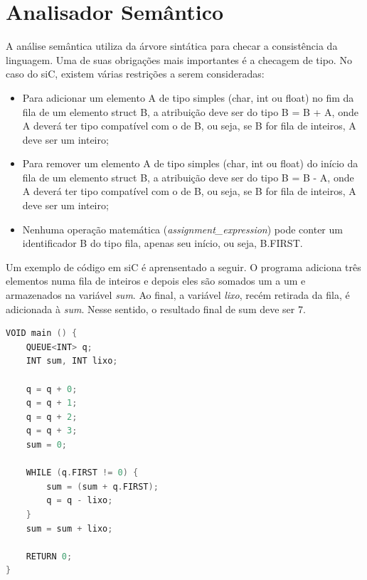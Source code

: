 \documentclass[12pt]{article}
\begin{document}


\section{Analisador Semântico}

\indent A análise semântica utiliza da árvore sintática para checar a consistência da linguagem. Uma de suas obrigações mais importantes é a checagem de tipo. No caso do siC, existem várias restrições a serem consideradas:
\begin{itemize}
    \item Para adicionar um elemento A de tipo simples (char, int ou float) no fim da fila de um elemento struct B, a atribuição deve ser do tipo B = B + A, onde A deverá ter tipo compatível com o de B, ou seja, se B for fila de inteiros, A deve ser um inteiro;
    \item Para remover um elemento A de tipo simples (char, int ou float) do início da fila de um elemento struct B, a atribuição deve ser do tipo B = B - A, onde A deverá ter tipo compatível com o de B, ou seja, se B for fila de inteiros, A deve ser um inteiro;
    \item Nenhuma operação matemática (\textit{assignment\_expression}) pode conter um identificador B do tipo fila, apenas seu início, ou seja, B.FIRST.
\end{itemize}

\indent Um exemplo de código em siC é aprensentado a seguir. O programa adiciona três elementos numa fila de inteiros e depois eles são somados um a um e armazenados na variável \textit{sum}. Ao final, a variável \textit{lixo}, recém retirada da fila, é adicionada à \textit{sum}. Nesse sentido, o resultado final de sum deve ser 7. \\

\begin{lstlisting}[language=C]
VOID main () {
    QUEUE<INT> q;
    INT sum, INT lixo;

    q = q + 0;
    q = q + 1;
    q = q + 2;
    q = q + 3;    
    sum = 0;
    
    WHILE (q.FIRST != 0) {    
        sum = (sum + q.FIRST);
        q = q - lixo;
    }
    sum = sum + lixo;

    RETURN 0;
}

\end{lstlisting}
\end{document}
